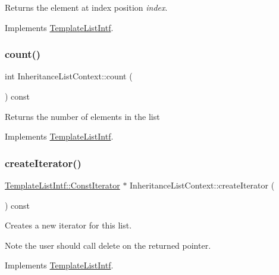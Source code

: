 Returns the element at index position {\itshape index}. 

Implements \mbox{\hyperlink{class_template_list_intf_aa51e57e72eacf4e8ce1055ee30a0f7f8}{Template\+List\+Intf}}.

\mbox{\label{class_inheritance_list_context_aa7fe14f7d71b1d955c22b26cb320f77b}} 
\subsubsection{\texorpdfstring{count()}{count()}}
{\footnotesize\ttfamily int Inheritance\+List\+Context\+::count (\begin{DoxyParamCaption}{ }\end{DoxyParamCaption}) const\hspace{0.3cm}{\ttfamily [virtual]}}

Returns the number of elements in the list 

Implements \mbox{\hyperlink{class_template_list_intf_a329e49e33484c2aa5106aac1bf4e5216}{Template\+List\+Intf}}.

\mbox{\label{class_inheritance_list_context_aaeb8bab49572f9c9d390a4e197764c90}} 
\subsubsection{\texorpdfstring{createIterator()}{createIterator()}}
{\footnotesize\ttfamily \mbox{\hyperlink{class_template_list_intf_1_1_const_iterator}{Template\+List\+Intf\+::\+Const\+Iterator}} $\ast$ Inheritance\+List\+Context\+::create\+Iterator (\begin{DoxyParamCaption}{ }\end{DoxyParamCaption}) const\hspace{0.3cm}{\ttfamily [virtual]}}

Creates a new iterator for this list. \begin{DoxyNote}{Note}
the user should call delete on the returned pointer. 
\end{DoxyNote}


Implements \mbox{\hyperlink{class_template_list_intf_a56b82384db24c3e121076a1da046d378}{Template\+List\+Intf}}.

